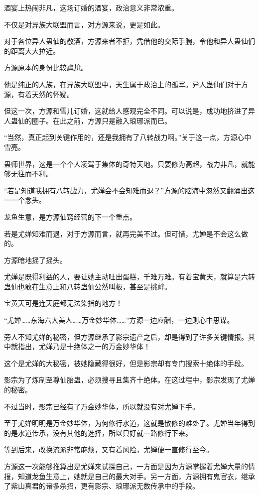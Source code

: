 
\begin{this_body}

酒宴上热闹非凡，这场订婚的酒宴，政治意义非常浓重。

不仅是对异族大联盟而言，对方源来说，更是如此。

对于各位异人蛊仙的敬酒，方源来者不拒，凭借他的交际手腕，令他和异人蛊仙们的距离大大拉近。

方源原本的身份比较尴尬。

他是纯正的人族，在异族大联盟中，天生属于政治上的孤军。异人蛊仙们对于方源，有着天然的怀疑。

但这一次，方源和雪儿订婚，这就给人感观完全不同。可以说是，成功地挤进了异人蛊仙的圈子。在此之前，方源只是融入琅琊派而已。

“当然，真正起到关键作用的，还是我拥有了八转战力啊。”关于这一点，方源心中雪亮。

蛊师世界，这是一个个人凌驾于集体的奇特天地。只要修为高超，战力非凡，就能够无往而不利。

“若是知道我拥有八转战力，尤婵会不会知难而退？”方源的脑海中忽然又翻涌出这一一个念头。

龙鱼生意，是方源仙窍经营的下一个重点。

若是尤婵知难而退，对于方源而言，就再完美不过。但可惜，尤婵是不会这么做的。

方源暗地摇了摇头。

尤婵是既得利益的人，要让她主动吐出蛋糕，千难万难。有着宝黄天，就算是六转蛊仙也敢在生意上和八转蛊仙公然叫板，甚至是挑衅。

宝黄天可是连天庭都无法染指的地方！

“尤婵……东海六大美人……万金妙华体……”方源一边应酬，一边则心中思谋。

旁人不知尤婵的秘密，但方源继承了影宗遗产之后，却是得到了许多关键情报。其中就指出，尤婵乃是十绝体之一的万金妙华体！

这个是尤婵的大秘密，被她隐藏得很好，但是影宗却有专门搜索十绝体的手段。

影宗为了炼制至尊仙胎蛊，必须搜寻且集齐十绝体。在这过程中，影宗发现了尤婵的秘密。

不过当时，影宗已经有了万金妙华体，所以就没有对尤婵下手。

至于尤婵明明是万金妙华体，为何修行水道，这就是散修的难处了。尤婵当年得到的是水道传承，没有其他的选择，所以只好就一路修行下来。

等到后来，改换流派非常麻烦，又有着风险，尤婵便一直修行至今。

方源这一次能够推算出是尤婵来试探自己，一方面是因为方源掌握着尤婵大量的情报，知道龙鱼生意上，她就是自己的最大对手。另一方面，方源拥有鬼官衣，继承了紫山真君的诸多杀招，更有影宗、琅琊派无数传承中的手段。


\end{this_body}
